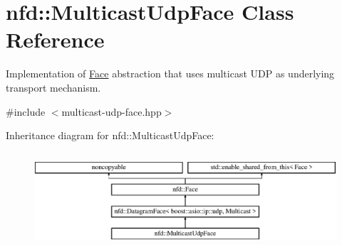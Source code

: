 \hypertarget{classnfd_1_1MulticastUdpFace}{}\section{nfd\+:\+:Multicast\+Udp\+Face Class Reference}
\label{classnfd_1_1MulticastUdpFace}


Implementation of \hyperlink{classnfd_1_1Face}{Face} abstraction that uses multicast U\+DP as underlying transport mechanism.  




{\ttfamily \#include $<$multicast-\/udp-\/face.\+hpp$>$}

Inheritance diagram for nfd\+:\+:Multicast\+Udp\+Face\+:\begin{figure}[H]
\begin{center}
\leavevmode
\includegraphics[height=3.589744cm]{classnfd_1_1MulticastUdpFace}
\end{center}
\end{figure}
